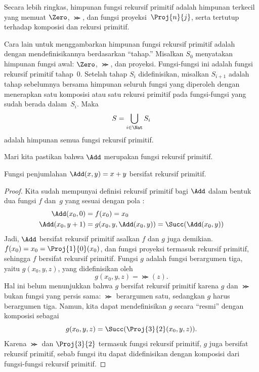 \documentclass[../../../include/open-logic-section]{subfiles}
\begin{document}
\begin{explain}
Secara lebih ringkas, himpunan fungsi rekursif primitif adalah himpunan
terkecil yang memuat $\Zero$, $\Succ$, dan fungsi proyeksi~$\Proj{n}{j}$,
serta tertutup terhadap komposisi dan rekursi primitif.

Cara lain untuk menggambarkan himpunan fungsi rekursif primitif adalah dengan
mendefinisikannya berdasarkan ``tahap.'' Misalkan $S_0$ menyatakan himpunan
fungsi awal: $\Zero$, $\Succ$, dan proyeksi. Fungsi-fungsi ini adalah fungsi
rekursif primitif tahap~$0$. Setelah tahap $S_i$ didefinisikan, misalkan
$S_{i+1}$ adalah tahap sebelumnya bersama himpunan seluruh fungsi yang diperoleh dengan
menerapkan satu komposisi atau satu rekursi primitif pada fungsi-fungsi yang
sudah berada dalam~$S_i$. Maka
\[
S = \bigcup_{i \in \Nat} S_i
\]
adalah himpunan semua fungsi rekursif primitif.
\end{explain}

Mari kita pastikan bahwa $\Add$ merupakan fungsi rekursif primitif.

\begin{prop}
  Fungsi penjumlahan $\Add(x,y) = x+y$ bersifat rekursif primitif.
\end{prop}

\begin{proof}
Kita sudah mempunyai definisi rekursif primitif bagi $\Add$ dalam bentuk dua
fungsi $f$ dan~$g$ yang sesuai dengan pola
:
\begin{align*}
  \Add(x_0, 0) & = f(x_0) = x_0\\
  \Add(x_0, y+1) & = g(x_0, y, \Add(x_0, y)) =
  \Succ(\Add(x_0, y))
\end{align*}
Jadi, $\Add$ bersifat rekursif primitif asalkan $f$ dan $g$ juga demikian.
$f(x_0) = x_0 = \Proj{1}{0}(x_0)$, dan fungsi proyeksi termasuk rekursif
primitif, sehingga $f$ bersifat rekursif primitif. Fungsi $g$ adalah fungsi
berargumen tiga, yaitu $g(x_0, y, z)$, yang didefinisikan oleh
\[
g(x_0, y, z) = \Succ(z).
\]
Hal ini belum menunjukkan bahwa $g$ bersifat rekursif primitif karena $g$ dan
$\Succ$ bukan fungsi yang persis sama: $\Succ$ berargumen satu, sedangkan $g$
harus berargumen tiga. Namun, kita dapat mendefinisikan $g$ secara ``resmi''
dengan komposisi sebagai
\[
g(x_0, y, z) = \Succ(\Proj{3}{2}(x_0, y, z)).
\]
Karena $\Succ$ dan $\Proj{3}{2}$ termasuk fungsi rekursif primitif, $g$ juga
bersifat rekursif primitif, sebab fungsi itu dapat didefinisikan dengan
komposisi dari fungsi-fungsi rekursif primitif.
\end{proof}
\end{document}
